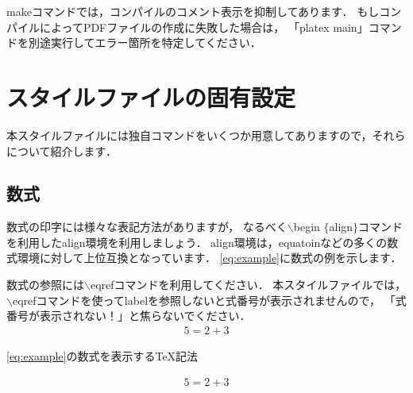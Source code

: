 makeコマンドでは，コンパイルのコメント表示を抑制してあります．
もしコンパイルによってPDFファイルの作成に失敗した場合は，
「platex main」コマンドを別途実行してエラー箇所を特定してください．
\section{スタイルファイルの固有設定}
\label{sec:master}
本スタイルファイルには独自コマンドをいくつか用意してありますので，それらについて紹介します．

\subsection{数式}
数式の印字には様々な表記方法がありますが，
なるべく$\backslash$begin $\{$align$\}$コマンドを利用したalign環境を利用しましょう．
align環境は，equatoinなどの多くの数式環境に対して上位互換となっています．
\eqref{eq:example}に数式の例を示します．

数式の参照には$\backslash$eqrefコマンドを利用してください．
本スタイルファイルでは，
$\backslash$eqrefコマンドを使ってlabelを参照しないと式番号が表示されませんので，
「式番号が表示されない！」と焦らないでください．
%
\begin{align}
	5 = 2 + 3
	\label{eq:example}
\end{align}
%
\begin{lstbox}{\eqref{eq:example}の数式を表示するTeX記法}
\begin{minilst}
\begin{align}
	5 = 2 + 3
	\label{eq:1}
\end{align}
\end{minilst}
\end{lstbox}

